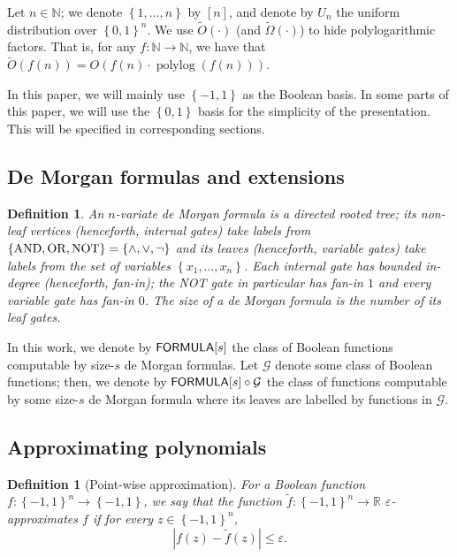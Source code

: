 \documentclass[10pt,a4paper]{article}
\newtheorem{definition}[theorem]{Definition}
\newcommand{\polylog}{\operatorname{polylog}}
\newcommand{\bool}{\left\{0,1\right\}}
\newcommand{\boolpm}{\left\{-1,1\right\}}
\newcommand{\FORMULA}{{\sf FORMULA}}
\newcommand{\uniform}{U}
\newcommand{\real}{\mathbb{R}}
\newcommand{\cprn}[1]{\!\left(#1\right)}
\newcommand{\brkts}[1]{\left\{#1\right\}}
\begin{document}
	Let $n\in\mathbb{N}$; we denote $\brkts{1,\dots,n}$ by $[n]$, and denote by $\uniform_n$ the uniform distribution over $\bool^n$. We use $\widetilde{O}(\cdot)$ (and $\widetilde{\Omega}(\cdot)$)  to hide polylogarithmic factors. That is, for any $f\colon\mathbb{N}\to\mathbb{N}$, we have that $\widetilde{O}(f(n))=O\cprn{f(n)\cdot\polylog\cprn{f(n)}}$.
	
	In this paper, we will mainly use $\boolpm$ as the Boolean basis. In some parts of this paper, we will use the $\bool$ basis for the simplicity of the presentation. This will be specified in corresponding sections.
	
	\subsection{De Morgan formulas and extensions}
	
	\begin{definition}
	    An $n$-variate \emph{de Morgan formula} is a directed rooted tree; its non-leaf vertices (henceforth, \emph{internal gates}) take labels from $\brkts{{\rm AND},{\rm OR},{\rm NOT}}=\brkts{\land,\lor,\neg}$ and its leaves (henceforth, \emph{variable gates}) take labels from the set of variables $\brkts{x_1,\dots,x_n}$. Each internal gate has bounded in-degree (henceforth, \emph{fan-in}); the {\rm NOT} gate in particular has fan-in $1$ and every variable gate has fan-in $0$. The \emph{size} of a de Morgan formula is the number of its leaf gates.
%
	\end{definition}
	
	In this work, we denote by $\FORMULA[s]$ the class of Boolean functions computable by size-$s$ de Morgan formulas. Let $\mathcal{G}$ denote some class of Boolean functions; then, we denote by $\FORMULA[s]\circ\mathcal{G}$ the class of functions computable by some size-$s$ de Morgan formula where its leaves are labelled by functions in $\mathcal{G}$.
	
%
	
%
%
%
%
%
%
%
%
%
    
%
%
%
%
%
    
    \subsection{Approximating polynomials}
    
    \begin{definition}[Point-wise approximation]
        For a Boolean function $f\colon\boolpm^n\to\boolpm$, we say that the function $\tilde{f}\colon\boolpm^n\to\real$ $\varepsilon$-approximates $f$ if for every $z\in\boolpm^n$,
		\[
			\left| f(z)-\tilde{f}(z)\right| \leq \varepsilon.
		\]
    \end{definition}
    
\end{document}
